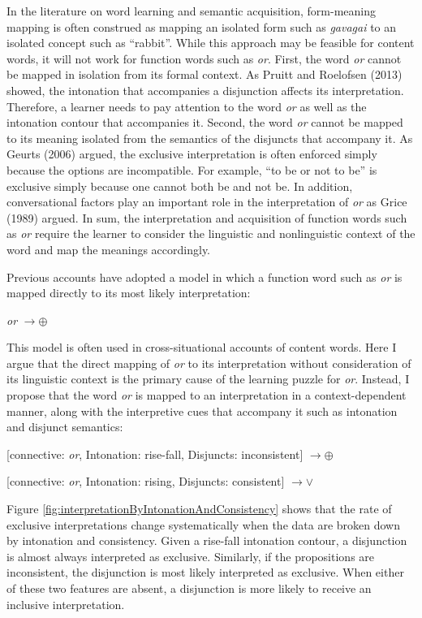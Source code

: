 \documentclass[floatsintext,man]{apa6}
\theoremstyle{definition}
\theoremstyle{definition}
\theoremstyle{definition}
\theoremstyle{remark}
\begin{document}
In the literature on word learning and semantic acquisition,
form-meaning mapping is often construed as mapping an isolated form such
as \emph{gavagai} to an isolated concept such as \enquote{rabbit}. While
this approach may be feasible for content words, it will not work for
function words such as \emph{or}. First, the word \emph{or} cannot be
mapped in isolation from its formal context. As Pruitt and Roelofsen
(2013) showed, the intonation that accompanies a disjunction affects its
interpretation. Therefore, a learner needs to pay attention to the word
\emph{or} as well as the intonation contour that accompanies it. Second,
the word \emph{or} cannot be mapped to its meaning isolated from the
semantics of the disjuncts that accompany it. As Geurts (2006) argued,
the exclusive interpretation is often enforced simply because the
options are incompatible. For example, \enquote{to be or not to be} is
exclusive simply because one cannot both be and not be. In addition,
conversational factors play an important role in the interpretation of
\emph{or} as Grice (1989) argued. In sum, the interpretation and
acquisition of function words such as \emph{or} require the learner to
consider the linguistic and nonlinguistic context of the word and map
the meanings accordingly.

Previous accounts have adopted a model in which a function word such as
\emph{or} is mapped directly to its most likely interpretation:

\emph{or} \(\rightarrow \oplus\)

This model is often used in cross-situational accounts of content words.
Here I argue that the direct mapping of \emph{or} to its interpretation
without consideration of its linguistic context is the primary cause of
the learning puzzle for \emph{or}. Instead, I propose that the word
\emph{or} is mapped to an interpretation in a context-dependent manner,
along with the interpretive cues that accompany it such as intonation
and disjunct semantics:

{[}connective: \emph{or}, Intonation: rise-fall, Disjuncts:
inconsistent{]} \(\rightarrow \oplus\)

{[}connective: \emph{or}, Intonation: rising, Disjuncts: consistent{]}
\(\rightarrow \lor\)

Figure \ref{fig:interpretationByIntonationAndConsistency} shows that the
rate of exclusive interpretations change systematically when the data
are broken down by intonation and consistency. Given a rise-fall
intonation contour, a disjunction is almost always interpreted as
exclusive. Similarly, if the propositions are inconsistent, the
disjunction is most likely interpreted as exclusive. When either of
these two features are absent, a disjunction is more likely to receive
an inclusive interpretation.
\end{document}
